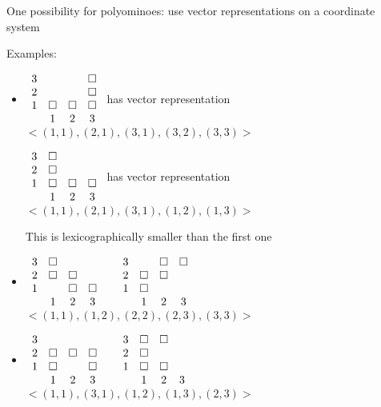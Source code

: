\documentclass[11pt]{article}
\begin{document}
One possibility for polyominoes: use vector representations on a coordinate system \newline

Examples:
\begin{itemize}
\item $
\begin{array}{l c c c}
3 & & & \square \\
2 & & & \square \\
1 & \square & \square & \square \\
& 1 & 2 & 3 \\
\end{array}
$
has vector representation $ <(1, 1), (2, 1), (3, 1), (3, 2), (3, 3)> $

$
\begin{array}{l c c c}
3 & \square \\
2 & \square \\
1 & \square & \square & \square \\
& 1 & 2 & 3 \\
\end{array}
$
has vector representation
$  <(1, 1), (2, 1), (3, 1), (1, 2), (1, 3)> $

This is lexicographically smaller than the first one

\item 
$
\begin{array}{l c c c}
3 & \square \\
2 & \square & \square \\
1 & & \square & \square \\
& 1 & 2 & 3 \\
\end{array}
~~~~
\begin{array}{l c c c}
3 & & \square & \square \\
2 & \square & \square \\
1 & \square \\
& 1 & 2 & 3 \\
\end{array}
$
$ <(1, 1), (1, 2), (2, 2), (2, 3), (3, 3)> $ \bigskip

\item
$
\begin{array}{l c c c}
3 \\
2 & \square & \square & \square \\
1 & \square & & \square \\
& 1 & 2 & 3 \\
\end{array}
~~~~
\begin{array}{l c c c}
3 & \square & \square \\
2 & \square \\
1 & \square & \square \\
& 1 & 2 & 3 \\
\end{array}
$
$ <(1, 1), (3, 1), (1, 2), (1, 3), (2, 3)> $
\end{itemize}
\end{document}
